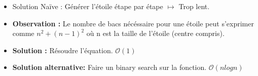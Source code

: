 \begin{frame}
    \frametitle{\problemtitle}
    \begin{itemize}
        \begin{block}{Problème}
            On a $n$ bacs, déterminer la taille de l'étoile.
        \end{block}
        \item<+-> Solution Naïve : Générer l'étoile étape par étape $\mapsto$ Trop lent.
        \item<+-> \textbf{Observation :} Le nombre de bacs nécéssaire pour une étoile peut s'exprimer comme $n^2 + (n-1)^2$ où n est la taille de l'étoile (centre compris).
        \item<+-> \textbf{Solution :} Résoudre l'équation. $\mathcal{O}(1)$
        \item<+-> \textbf{Solution alternative:} Faire un binary search sur la fonction. $\mathcal{O}(n log n)$
    \end{itemize}
    \solvestats
\end{frame}
